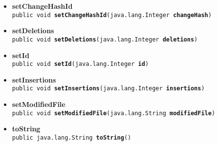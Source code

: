 {{{\begin{itemize}
{\texttt{public native int\ {\bf  hashCode}()
\label{it.unisa.sesa.repominer.db.entities.ChangeForCommit.hashCode()}}%
}%
\item{ 
\hypertarget{it.unisa.sesa.repominer.db.entities.ChangeForCommit.setChangeHashId(java.lang.Integer)}{{\bf  setChangeHashId}\\}
\texttt{public void\ {\bf  setChangeHashId}(\texttt{java.lang.Integer} {\bf  changeHash})
\label{it.unisa.sesa.repominer.db.entities.ChangeForCommit.setChangeHashId(java.lang.Integer)}}%
}%
\item{ 
\hypertarget{it.unisa.sesa.repominer.db.entities.ChangeForCommit.setDeletions(java.lang.Integer)}{{\bf  setDeletions}\\}
\texttt{public void\ {\bf  setDeletions}(\texttt{java.lang.Integer} {\bf  deletions})
\label{it.unisa.sesa.repominer.db.entities.ChangeForCommit.setDeletions(java.lang.Integer)}}%
}%
\item{ 
\hypertarget{it.unisa.sesa.repominer.db.entities.ChangeForCommit.setId(java.lang.Integer)}{{\bf  setId}\\}
\texttt{public void\ {\bf  setId}(\texttt{java.lang.Integer} {\bf  id})
\label{it.unisa.sesa.repominer.db.entities.ChangeForCommit.setId(java.lang.Integer)}}%
}%
\item{ 
\hypertarget{it.unisa.sesa.repominer.db.entities.ChangeForCommit.setInsertions(java.lang.Integer)}{{\bf  setInsertions}\\}
\texttt{public void\ {\bf  setInsertions}(\texttt{java.lang.Integer} {\bf  insertions})
\label{it.unisa.sesa.repominer.db.entities.ChangeForCommit.setInsertions(java.lang.Integer)}}%
}%
\item{ 
\hypertarget{it.unisa.sesa.repominer.db.entities.ChangeForCommit.setModifiedFile(java.lang.String)}{{\bf  setModifiedFile}\\}
\texttt{public void\ {\bf  setModifiedFile}(\texttt{java.lang.String} {\bf  modifiedFile})
\label{it.unisa.sesa.repominer.db.entities.ChangeForCommit.setModifiedFile(java.lang.String)}}%
}%
\item{ 
\hypertarget{it.unisa.sesa.repominer.db.entities.ChangeForCommit.toString()}{{\bf  toString}\\}
\texttt{public java.lang.String\ {\bf  toString}()
\label{it.unisa.sesa.repominer.db.entities.ChangeForCommit.toString()}}%
}%
\end{itemize}
}
}
}
